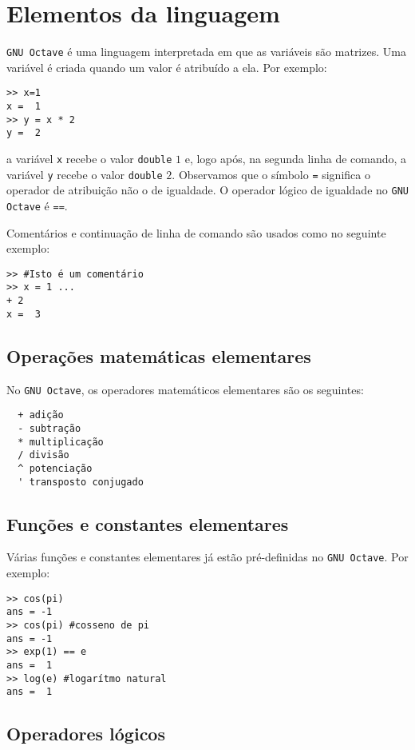 \section{Elementos da linguagem}

\verb+GNU Octave+ é uma linguagem interpretada em que as variáveis são matrizes. Uma variável é criada quando um valor é atribuído a ela. Por exemplo:
\begin{verbatim}
>> x=1
x =  1
>> y = x * 2
y =  2  
\end{verbatim}
a variável \verb+x+ recebe o valor \verb+double+ $1$ e, logo após, na segunda linha de comando, a variável \verb+y+ recebe o valor \verb+double+ $2$. Observamos que o símbolo \verb+=+ significa o operador de atribuição não o de igualdade. O operador lógico de igualdade no \verb+GNU Octave+ é \verb+==+.

Comentários e continuação de linha de comando são usados como no seguinte exemplo:
\begin{verbatim}
>> #Isto é um comentário
>> x = 1 ...
+ 2
x =  3  
\end{verbatim}

\subsection{Operações matemáticas elementares}

No \verb+GNU Octave+, os operadores matemáticos elementares são os seguintes:
\begin{verbatim}
  + adição
  - subtração
  * multiplicação
  / divisão
  ^ potenciação
  ' transposto conjugado
\end{verbatim}

\subsection{Funções e constantes elementares}

Várias funções e constantes elementares já estão pré-definidas no \verb+GNU Octave+. Por exemplo:
\begin{verbatim}
>> cos(pi)
ans = -1
>> cos(pi) #cosseno de pi
ans = -1
>> exp(1) == e
ans =  1
>> log(e) #logarítmo natural
ans =  1
\end{verbatim}

\subsection{Operadores lógicos}

